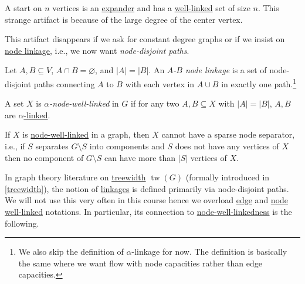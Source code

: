 \begin{eg}[Star]
	A start on \(n\) vertices is an \hyperref[def:expander]{expander} and has a \hyperref[def:well-linked]{well-linked} set of size \(n\). This strange artifact is because of the large degree of the center vertex.
\end{eg}

This artifact disappears if we ask for constant degree graphs or if we insist on \hyperref[def:node-linkage]{node linkage}, i.e., we now want \emph{node-disjoint paths}.

\begin{definition}\label{def:node-linkage}
	Let \(A, B \subseteq V\), \(A \cap B = \varnothing \), and \(\lvert A \rvert = \lvert B \rvert \). An \emph{\(A\)-\(B\) node linkage} is a set of node-disjoint paths connecting \(A\) to \(B\) with each vertex in \(A \cup B\) in exactly one path.\footnote{We also skip the definition of \(\alpha \)-linkage for now. The definition is basically the same where we want flow with node capacities rather than edge capacities.}
\end{definition}

\begin{definition}\label{def:node-well-linked}
	A set \(X\) is \emph{\(\alpha \)-node-well-linked} in \(G\) if for any two \(A, B \subseteq X\) with \(\lvert A \rvert = \lvert B \rvert \), \(A, B\) are \hyperref[def:node-linkage]{\(\alpha \)-linked}.
\end{definition}

\begin{intuition}
	If \(X\) is \hyperref[def:node-well-linked]{node-well-linked} in a graph, then \(X\) cannot have a sparse node separator, i.e., if \(S\) separates \(G\setminus S\)  	into components and \(S\) does not have any vertices of \(X\) then no component of \(G\setminus S\) can have more than \(\lvert S \rvert \) vertices of \(X\).
\end{intuition}

In graph theory literature on \href{https://en.wikipedia.org/wiki/Treewidth}{treewidth} \(\operatorname{tw}(G)\)  (formally introduced in \autoref{treewidth}), the notion of \hyperref[def:linkage]{linkages} is defined primarily via node-disjoint paths. We will not use this very often in this course hence we overload \hyperref[def:linkage]{edge} and \hyperref[def:node-well-linked]{node well-linked} notations. In particular, its connection to \hyperref[def:node-well-linked]{node-well-linkedness} is the following.


